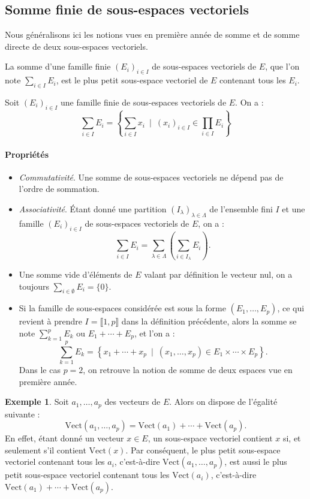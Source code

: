 \documentclass[french]{article}
\newcommand{\Vect}{\text{Vect}}
\theoremstyle{plain}
\theoremstyle{definition}
\newtheorem*{ex}{Exemple}
\theoremstyle{remark}
\begin{document}
\subsection{Somme finie de sous-espaces vectoriels}

Nous généralisons ici les notions vues en première année de somme et de somme directe de deux sous-espaces vectoriels.

\begin{dfn}
	La somme d'une famille finie $(E_i)_{i\in I}$ de sous-espaces vectoriels de $E$, que l'on note $\displaystyle\sum_{i\in I}E_i$, est le plus petit sous-espace vectoriel de $E$ contenant tous les $E_i$.
\end{dfn}

\begin{prop}
	Soit $(E_i)_{i\in I}$ une famille finie de sous-espaces vectoriels de $E$. On a : $$\sum_{i\in I}E_i=\left\{\sum_{i\in I}x_i\ \mid\ (x_i)_{i\in I}\in\prod_{i\in I} E_i\right\}$$
\end{prop}

\paragraph{Propriétés}
\begin{itemize}
	\item \textit{Commutativité}. Une somme de sous-espaces vectoriels ne dépend pas de l'ordre de sommation.
	\item \textit{Associativité}. Étant donné une partition $(I_\lambda)_{\lambda\in\Lambda}$ de l'ensemble fini $I$ et une famille $(E_i)_{i\in I}$ de sous-espaces vectoriels de $E$, on a : $$\sum_{i\in I}E_i=\sum_{\lambda\in\Lambda}\left(\sum_{i\in I_\lambda}E_i\right).$$
	\item Une somme vide d'éléments de $E$ valant par définition le vecteur nul, on a toujours $\displaystyle\sum_{i\in\emptyset}E_i=\{0\}$.
	\item Si la famille de sous-espaces considérée est sous la forme $(E_1,\ldots,E_p)$, ce qui revient à prendre $I=\llbracket1,p\rrbracket$ dans la définition précédente, alors la somme se note $\displaystyle\sum_{k=1}^{p}E_k$ ou $E_1+\cdots+E_p$, et l'on a : $$\sum_{k=1}^{p}E_k=\left\{x_1+\cdots+x_p\ \mid\ (x_1,\ldots,x_p)\in E_1\times\cdots\times E_p\right\}.$$ Dans le cas $p=2$, on retrouve la notion de somme de deux espaces vue en première année.
\end{itemize}

\begin{ex}
	Soit $a_1,\ldots,a_p$ des vecteurs de $E$. Alors on dispose de l'égalité suivante : $$\Vect(a_1,\ldots,a_p)=\Vect(a_1)+\cdots+\Vect(a_p).$$ En effet, étant donné un vecteur $x\in E$, un sous-espace vectoriel contient $x$ si, et seulement s'il contient $\Vect(x)$. Par conséquent, le plus petit sous-espace vectoriel contenant tous les $a_i$, c'est-à-dire $\Vect(a_1,\ldots,a_p)$, est aussi le plus petit sous-espace vectoriel contenant tous les $\Vect(a_i)$, c'est-à-dire $\Vect(a_1)+\cdots+\Vect(a_p)$.
\end{ex}
\end{document}
